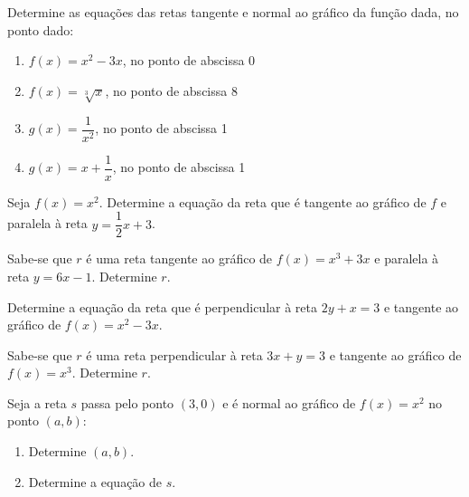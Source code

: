 \begin{exercicio}[1]
\label{ex:7.16.1}
Determine as equações das retas tangente e normal ao gráfico da função dada, no ponto dado:
\begin{enumerate}[label=\alph*)]
    \item $f(x) = x^2 - 3x$, no ponto de abscissa 0
    \item $f(x) = \sqrt[3]{x}$, no ponto de abscissa 8
    \item $g(x) = \dfrac{1}{x^2}$, no ponto de abscissa 1
    \item $g(x) = x + \dfrac{1}{x}$, no ponto de abscissa 1
\end{enumerate}
\end{exercicio}

\begin{exercicio}[2]
\label{ex:7.16.2}
Seja $f(x) = x^2$. Determine a equação da reta que é tangente ao gráfico de $f$ e paralela à reta $y = \dfrac{1}{2}x + 3$.
\end{exercicio}

\begin{exercicio}[3]
\label{ex:7.16.3}
Sabe-se que $r$ é uma reta tangente ao gráfico de $f(x) = x^3 + 3x$ e paralela à reta $y = 6x - 1$. Determine $r$.
\end{exercicio}

\begin{exercicio}[4]
\label{ex:7.16.4}
Determine a equação da reta que é perpendicular à reta $2y + x = 3$ e tangente ao gráfico de $f(x) = x^2 - 3x$.
\end{exercicio}

\begin{exercicio}[5]
\label{ex:7.16.5}
Sabe-se que $r$ é uma reta perpendicular à reta $3x + y = 3$ e tangente ao gráfico de $f(x) = x^3$. Determine $r$.
\end{exercicio}

\begin{exercicio}[6]
\label{ex:7.16.6}
Seja a reta $s$ passa pelo ponto $(3, 0)$ e é normal ao gráfico de $f(x) = x^2$ no ponto $(a, b)$:
\begin{enumerate}[label=\alph*)]
    \item Determine $(a, b)$.
    \item Determine a equação de $s$.
\end{enumerate}
\end{exercicio}

